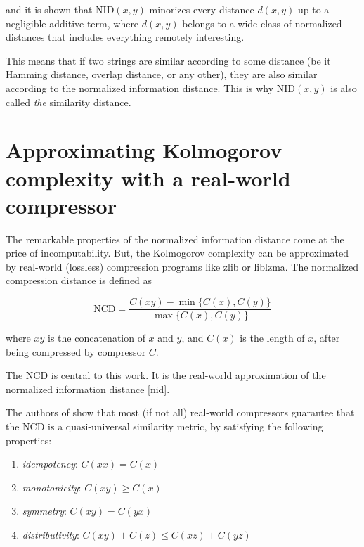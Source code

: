 and it is shown that $ \text{NID}(x, y)$ minorizes every distance $d(x, y)$ up to a negligible additive term, where $d(x, y)$ belongs to a wide class of normalized distances that includes everything remotely interesting.

This means that if two strings are similar according to some distance (be it Hamming distance, overlap distance, or any other), they are also similar according to the normalized information distance. This is why $	\text{NID}(x, y)$ is also called \emph{the} similarity distance.

\section{Approximating Kolmogorov complexity with a real-world compressor}

The remarkable properties of the normalized information distance come at the price of incomputability. But, the Kolmogorov complexity can be approximated by real-world (lossless) compression programs like zlib or liblzma. The normalized compression distance \cite{Cilibrasi2005} is defined as

\begin{equation}\label{ncd}
  \text{NCD} = \frac{C(xy) - \min \{ C(x), C(y) \}}{\max \{ C(x), C(y) \}}
\end{equation}

where $xy$ is the concatenation of $x$ and $y$, and $C(x)$ is the length of $x$, after being compressed by compressor $C$.

The $\text{NCD}$ is central to this work. It is the real-world approximation of the normalized information distance \eqref{nid}.

The authors of \cite{Cilibrasi2005} show that most (if not all) real-world compressors guarantee that the NCD is a quasi-universal similarity metric, by satisfying the following properties:

\begin{enumerate}
  \item \emph{idempotency}: $C(xx) = C(x)$
  \item \emph{monotonicity}: $C(xy) \geq C(x)$
  \item \emph{symmetry}: $C(xy) = C(yx)$
  \item \emph{distributivity}: $C(xy) + C(z) \leq C(xz) + C(yz)$
\end{enumerate}

